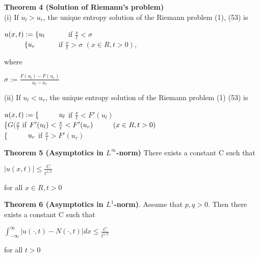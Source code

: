 \documentclass{article}
\newcommand\tab[1][1cm]{\hspace*{#1}}
\begin{document}
\textbf {Theorem 4 (Solution of Riemann's problem)} \\
\tab (i) If $u_l > u_r$, the unique entropy solution of the Riemann problem (1), (53) is
\begin{center}
$u(x,t) := \{ u_l \tab $ if $\frac{x}{t} < \sigma$ \\
$ \tab \{ u_r \tab $ if $\frac{x}{t} > \sigma$ \tab $(x \in R, t > 0)$,
\end{center}
where 
\begin{center}
$\sigma := \frac{F(u_l)-F(u_r)}{u_l - u_r}$
\end{center}
\tab (ii) If $u_l < u_r$, the unique entropy solution of the Riemann problem (1) (53) is
\begin{center}
$u(x,t) := \{ \tab u_l$ \tab if $\frac{x}{t} < F'(u_l)$ \\
\tab \{$G(\frac{x}{t}$ \tab if $F'(u_l) < \frac{x}{t} < F'(u_r) \tab (x \in R, t > 0)$ \\
\tab \{$\tab u_r$ \tab if $\frac{x}{t} > F'(u_r)$ 
\end{center}

\textbf {Theorem 5 (Asymptotics in $L^\infty$-norm)} There exists a constant C such that
\begin{center}
$|u(x,t)| \leq \frac{C}{t^{1/2}}$
\end{center}
for all $x \in R, t > 0$

\textbf {Theorem 6 (Asymptotics in $L^1$-norm)}. Assume that $p, q > 0$. Then there exists a constant C such that
\begin{center}
$\int_{-\infty}^{\infty} |u(\cdot , t) -N (\cdot , t)| dx \leq \frac{C}{t^{1/2}}$
\end{center}
for all $t > 0$
\end{document}

